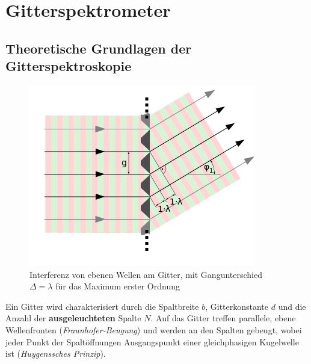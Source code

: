 \documentclass[a4paper, 11pt]{article}
\begin{document}
\newpage
\thispagestyle{empty}
\tableofcontents
\newpage

\pagestyle{fancy}
\fancyhf{}
\fancyhead[L]{\nouppercase{\leftmark}}
\fancyhead[R]{\thepage}
\renewcommand{\headrulewidth}{0.5pt}
\fancyfoot[C]{\thepage}


\setcounter{page}{1}

\section{Gitterspektrometer}

\subsection{Theoretische Grundlagen der Gitterspektroskopie}

\begin{figure}[H]
	\centering
	\includegraphics[scale=0.8]{./Bilder/Beugungsgitter-erstes-Maximum.png}
	\caption{Interferenz von ebenen Wellen am Gitter, mit Gangunterschied $\Delta=\lambda$ für das Maximum erster Ordnung \protect \footnotemark}
	\label{pic:Gitter}	
\end{figure}

Ein Gitter wird charakterisiert durch die Spaltbreite $b$, Gitterkonstante $d$ und die Anzahl der \textbf{ausgeleuchteten} Spalte $N$. Auf das Gitter treffen parallele, ebene Wellenfronten (\textit{Fraunhofer-Beugung}) und werden an den Spalten gebeugt, wobei jeder Punkt der Spaltöffnungen Ausgangspunkt einer gleichphasigen Kugelwelle ist (\textit{Huygenssches Prinzip}).
\end{document}
